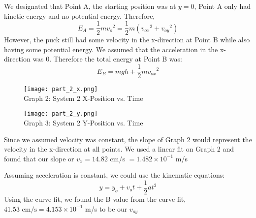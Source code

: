 \documentclass[fleqn]{article}
\begin{document}
We designated that Point A, the starting position was at $y=0$, Point A only had kinetic energy and no potential energy. Therefore,
\[ E_A=\frac{1}{2}m{v_o}^2=
	\frac{1}{2} m \left( {v _{ox} }^2 + {v _{oy} }^2 \right)
\]
However, the puck still had some velocity in the x-direction at Point B while also having some potential energy. We assumed that the acceleration in the x-direction was 0. Therefore the total energy at Point B was:
\[ E_B =
	mgh + \frac{1}{2} m{v _{ox} }^2
\]
\begin{figure}[H]
	\centering
	\texttt{[image: part\_2\_x.png]}
	\\Graph 2: System 2 X-Position vs. Time
\end{figure}

\begin{figure}[H]
	\centering
	\texttt{[image: part\_2\_y.png]}
	\\Graph 3: System 2 Y-Position vs. Time
\end{figure}


Since we assumed velocity was constant, the slope of Graph 2 would represent the velocity in the x-direction at all points. We used a linear fit on Graph 2 and found that our slope or $v_x = 14.82 $ cm/s $=1.482 \times 10^{-1} $ m/s

Assuming acceleration is constant, we could use the kinematic equations:
\[ y=y_o+v_ot+\frac{1}{2} at^2 \]
Using the curve fit, we found the B value from the curve fit, $41.53 \text{ cm/s}=4.153\times 10^{-1}$ m/s to be our $v_{oy}$
\end{document}
